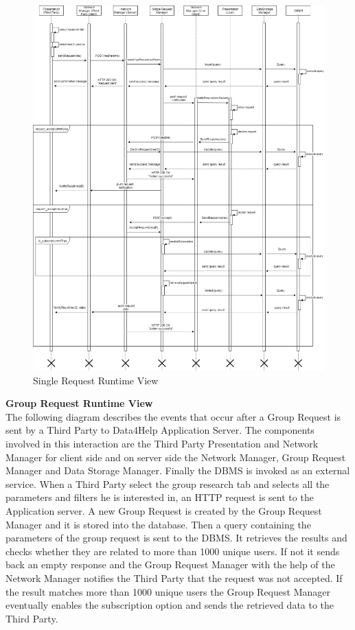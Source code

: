 \documentclass[titlepage]{article}
\begin{document}
\begin{figure}[H]
	\center
  	\includegraphics[width=15cm]{SingleRequest.png}
  	\caption{Single Request Runtime View}
 	\label{fig:SIGREQ}
\end{figure}


{\bf Group Request Runtime View }\\ 
The following diagram describes the events that occur after a Group Request is sent by a Third Party to Data4Help Application Server. The components involved in this interaction are the Third Party Presentation and Network Manager for client side and  on server side the Network Manager, Group Request Manager and Data Storage Manager. Finally the DBMS is invoked as an external service.
When a Third Party select the group research tab and selects all the parameters and filters he is interested in, an HTTP request is sent to the Application server. A new Group Request is created by the Group Request Manager and it is stored into the database. Then a query containing the parameters of the group request is sent to the DBMS. It retrieves the results and checks whether they are related to more than 1000 unique users. If not it sends back an empty response and the Group Request Manager with the help of the Network Manager notifies the Third Party that the request was not accepted. If the result matches more than 1000 unique users the Group Request Manager eventually enables the subscription option and sends the retrieved data to the Third Party.
\end{document}
